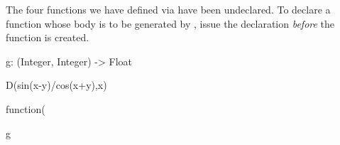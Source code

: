 The four functions we have defined via  have been undeclared.
To declare a function whose body is to be generated by
, issue the declaration {\it before} the function is created.
\begin{xtc}
\begin{xtccomment}
\end{xtccomment}
\begin{spadsrc}
g: (Integer, Integer) -> Float 
\end{spadsrc}
\end{xtc}
\begin{xtc}
\begin{xtccomment}
\end{xtccomment}
\begin{spadsrc}
D(sin(x-y)/cos(x+y),x) 
\end{spadsrc}
\begin{TeXOutput}
\begin{fricasmath}{15}
%
\end{fricasmath}
\end{TeXOutput}
\end{xtc}
\begin{xtc}
\begin{xtccomment}
\end{xtccomment}
\begin{spadsrc}
function(%
\end{spadsrc}
\begin{TeXOutput}
\begin{fricasmath}{16}
%
\end{fricasmath}
\end{TeXOutput}
\end{xtc}
\begin{xtc}
\begin{xtccomment}
\end{xtccomment}
\begin{spadsrc}
g 
\end{spadsrc}
\begin{TeXOutput}
\begin{fricasmath}{17}
\ \ \SYMBOL{==}\ %
\end{fricasmath}
\end{TeXOutput}
\end{xtc}
